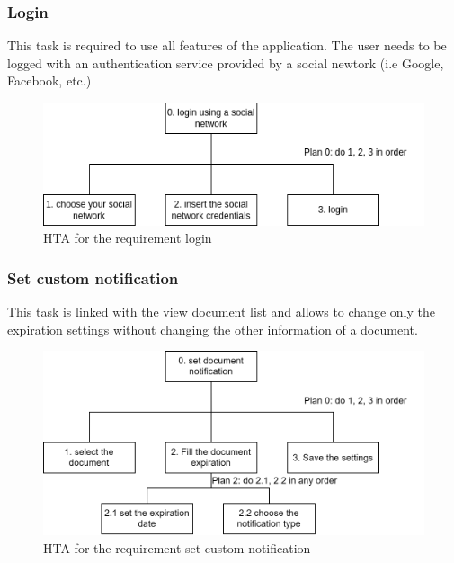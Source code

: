 \subsubsection{Login}
This task is required to use all features of the application. The user needs to be logged with an authentication service provided by a social newtork (i.e Google, Facebook, etc.)
\begin{figure}[H]
	\centering
	\includegraphics[width=\textwidth]{../Draw.io diagrams/login.drawio.png}  %
	\caption{HTA for the requirement login}
\end{figure}

\subsubsection{Set custom notification}
This task is linked with the view document list and allows to change only the expiration settings without changing the other information of a document. 
\begin{figure}[H]
	\centering
	\includegraphics[width=\textwidth]{../Draw.io diagrams/set_notification.drawio.png}  %
	\caption{HTA for the requirement set custom notification}
\end{figure}
